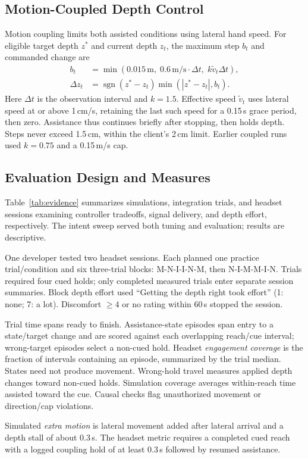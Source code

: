 \subsection{Motion-Coupled Depth Control}
Motion coupling limits both assisted conditions using lateral hand speed.
For eligible target depth $z^*$ and current depth $z_t$, the maximum step
$b_t$ and commanded change are
\begin{equation}
\begin{aligned}
b_t &= \min(0.015\,\mathrm{m},\; 0.6\,\mathrm{m/s}\cdot\Delta t,\; k\tilde v_t\Delta t),\\
\Delta z_t &= \operatorname{sgn}(z^*-z_t)\min(|z^*-z_t|,b_t).
\end{aligned}
\end{equation}
Here $\Delta t$ is the observation interval and $k=1.5$. Effective speed
$\tilde v_t$ uses lateral speed at or above 1\,cm/s, retaining the last such
speed for a 0.15\,s grace period, then zero. Assistance thus continues briefly
after stopping, then holds depth. Steps never exceed
1.5\,cm, within the client's 2\,cm limit. Earlier coupled runs used $k=0.75$
and a 0.15\,m/s cap.

\subsection{Evaluation Design and Measures}
Table~\ref{tab:evidence} summarizes simulations, integration trials, and headset
sessions examining controller tradeoffs, signal delivery, and depth effort,
respectively. The intent sweep served both tuning and evaluation; results
are descriptive.

One developer tested two headset sessions. Each planned one practice
trial/condition and six three-trial blocks: M-N-I-I-N-M, then N-I-M-M-I-N.
Trials required four cued holds; only completed measured trials enter separate
session summaries. Block depth effort used ``Getting the depth right took
effort'' (1: none; 7: a lot). Discomfort $\ge4$ or no rating within 60\,s
stopped the session.

Trial time spans ready to finish. Assistance-state episodes span entry to a
state/target change and are scored against each overlapping reach/cue interval;
wrong-target episodes select a non-cued hold. Headset \emph{engagement coverage}
is the fraction of intervals containing an episode, summarized by the trial
median. States need not produce movement. Wrong-hold travel measures applied
depth changes toward non-cued holds. Simulation coverage averages within-reach
time assisted toward the cue. Causal checks flag unauthorized movement or
direction/cap violations.

Simulated \emph{extra motion} is lateral movement added after lateral arrival
and a depth stall of about 0.3\,s. The headset metric requires a completed cued
reach with a logged coupling hold of at least 0.3\,s followed by resumed
assistance.
